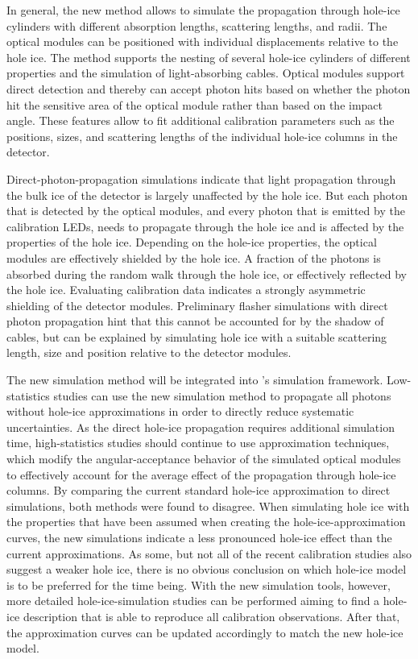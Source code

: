 In general, the new method allows to simulate the propagation through hole-ice cylinders with different absorption lengths, scattering lengths, and radii.
The optical modules can be positioned with individual displacements relative to the hole ice.
The method supports the nesting of several hole-ice cylinders of different properties and the simulation of light-absorbing cables.
Optical modules support direct detection and thereby can accept photon hits based on whether the photon hit the sensitive area of the optical module rather than based on the impact angle.
These features allow to fit additional calibration parameters such as the positions, sizes, and scattering lengths of the individual hole-ice columns in the \icecube detector.

Direct-photon-propagation simulations indicate that light propagation through the bulk ice of the \icecube detector is largely unaffected by the hole ice. But each photon that is detected by the optical modules, and every photon that is emitted by the calibration LEDs, needs to propagate through the hole ice and is affected by the properties of the hole ice.
Depending on the hole-ice properties, the optical modules are effectively shielded by the hole ice. A fraction of the photons is absorbed during the random walk through the hole ice, or effectively reflected by the hole ice.
Evaluating calibration data indicates a strongly asymmetric shielding of the detector modules. Preliminary flasher simulations with direct photon propagation hint that this cannot be accounted for by the shadow of cables, but can be explained by simulating hole ice with a suitable scattering length, size and position relative to the detector modules.

The new simulation method will be integrated into \icecube's simulation framework.
Low-statistics studies can use the new simulation method to propagate all photons without hole-ice approximations in order to directly reduce systematic uncertainties.
As the direct hole-ice propagation requires additional simulation time, high-statistics studies should continue to use approximation techniques, which modify the angular-acceptance behavior of the simulated optical modules to effectively account for the average effect of the propagation through hole-ice columns.
By comparing the current standard hole-ice approximation to direct simulations, both methods were found to disagree.
When simulating hole ice with the properties that have been assumed when creating the hole-ice-approximation curves, the new simulations indicate a less pronounced hole-ice effect than the current approximations.
As some, but not all of the recent calibration studies also suggest a weaker hole ice, there is no obvious conclusion on which hole-ice model is to be preferred for the time being.
With the new simulation tools, however, more detailed hole-ice-simulation studies can be performed aiming to find a hole-ice description that is able to reproduce all calibration observations.
After that, the approximation curves can be updated accordingly to match the new hole-ice model.

